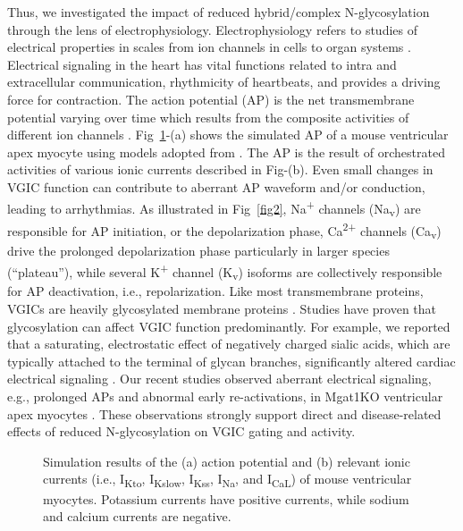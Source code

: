 \documentclass[10pt,letterpaper]{article}
\begin{document}
Thus, we investigated the impact of reduced hybrid/complex N-glycosylation through the lens of electrophysiology. Electrophysiology refers to studies of electrical properties in scales from ion channels in cells to organ systems \cite{scanziani2009electrophysiology}. Electrical signaling in the heart has vital functions related to intra and extracellular communication, rhythmicity of heartbeats, and provides a driving force for contraction. The action potential (AP) is the net transmembrane potential varying over time which results from the composite activities of different ion channels \cite{grant2009cardiac}. Fig~\ref{fig1}-(a) shows the simulated AP of a mouse ventricular apex myocyte using models adopted from \cite{bondarenko2004computer}. The AP is the result of orchestrated activities of various ionic currents described in Fig-(b). Even small changes in VGIC function can contribute to aberrant AP waveform and/or conduction, leading to arrhythmias. As illustrated in Fig~\ref{fig2}, Na\textsuperscript{+} channels (Na\textsubscript{v}) are responsible for AP initiation, or the depolarization phase, Ca\textsuperscript{2+} channels (Ca\textsubscript{v}) drive the prolonged depolarization phase particularly in larger species (“plateau”), while several K\textsuperscript{+} channel (K\textsubscript{v}) isoforms are collectively responsible for AP deactivation, i.e., repolarization. Like most transmembrane proteins, VGICs are heavily glycosylated membrane proteins \cite{ednie2011modulation}. Studies have proven that glycosylation can affect VGIC function predominantly. For example, we reported that a saturating, electrostatic effect of negatively charged sialic acids, which are typically attached to the terminal of glycan branches, significantly altered cardiac electrical signaling \cite{ednie2013expression, ednie2015reduced}. Our recent studies observed aberrant electrical signaling, e.g., prolonged APs and abnormal early re-activations, in Mgat1KO ventricular apex myocytes \cite{ednie2019reduced, ednie2019reduced2}. These observations strongly support direct and disease-related effects of reduced N-glycosylation on VGIC gating and activity.

\begin{figure}[!ht]
    \centering
    \caption{Simulation results of the (a) action potential and (b) relevant ionic currents (i.e., I\textsubscript{Kto}, I\textsubscript{Kslow}, I\textsubscript{Kss}, I\textsubscript{Na}, and I\textsubscript{CaL}) of mouse ventricular myocytes. Potassium currents have positive currents, while sodium and calcium currents are negative.}
    \label{fig1}
\end{figure}
\end{document}
